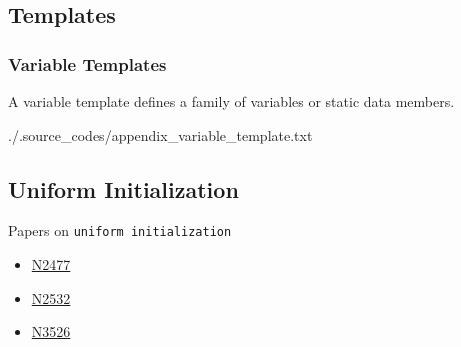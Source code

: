 \documentclass[a4paper, 12pt]{extbook}
\begin{document}
\subsection{Templates}
\subsubsection{Variable Templates}
\label{appendix:templates:variable_template}

A variable template defines a family of variables or static data members.


{./.source_codes/appendix_variable_template.txt}

\subsection{Uniform Initialization}

Papers on \verb|uniform initialization|

\begin{itemize}
  \item \href{http://www.open-std.org/jtc1/sc22/wg21/docs/papers/2007/n2477.pdf}{N2477}
  \item \href{http://www.open-std.org/jtc1/sc22/wg21/docs/papers/2008/n2532.pdf}{N2532}
  \item \href{http://www.open-std.org/jtc1/sc22/wg21/docs/papers/2013/n3526.html}{N3526}
\end{itemize}
\end{document}
